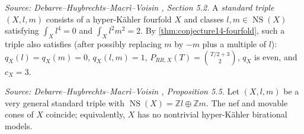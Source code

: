 \begin{definition}
  \label{def:standard-triple}
  \textit{Source: Debarre--Huybrechts--Macr\`i--Voisin \cite{MR4654610}, Section 5.2.}
  A \emph{standard triple} \((X, l, m)\) consists of a hyper-K\"ahler fourfold \(X\) and
  classes \(l, m \in \operatorname{NS}(X)\) satisfying \(\int_X l^4 = 0\) and
  \(\int_X l^2 m^2 = 2\).  By \cref{thm:conjecture14-fourfold}, such a triple also
  satisfies (after possibly replacing \(m\) by \(-m\) plus a multiple of \(l\)):
  \(q_X(l) = q_X(m) = 0\), \(q_X(l,m) = 1\), \(P_{RR,X}(T) = \binom{T/2 + 3}{2}\),
  \(q_X\) is even, and \(c_X = 3\).
\end{definition}

\begin{lemma}
  \label{lem:nef-movable-coincide}
  \textit{Source: Debarre--Huybrechts--Macr\`i--Voisin \cite{MR4654610}, Proposition 5.5.}
  Let \((X, l, m)\) be a very general standard triple with
  \(\operatorname{NS}(X) = \mathbb{Z}l \oplus \mathbb{Z}m\).  The nef and movable cones
  of \(X\) coincide; equivalently, \(X\) has no nontrivial hyper-K\"ahler birational
  models.
\end{lemma}

